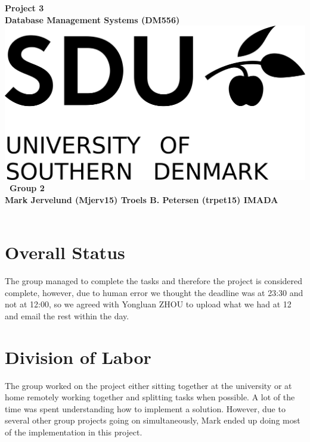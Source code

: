 \documentclass[a4paper,10pt,titlepage]{report}
\date{}
\begin{document}
\begin{titlepage}
\centering
    \vspace*{9\baselineskip}
    \huge
    \bfseries
    Project 3\\
    
    \normalfont 
	\huge    
    Database Management Systems (DM556)  \\[4\baselineskip]
    \normalfont
	\includegraphics[scale=1.5]{SDU_Logo}
    \vfill\
    Group 2\\
    Mark Jervelund (Mjerv15)    Troels B. Petersen (trpet15)
    \vspace{5mm}
    IMADA \\
    \textbf{\datedate} \\[2\baselineskip]
\end{titlepage}

\setcounter{page}{1}
\renewcommand{\thepage}{\arabic{page}}

\lstset{language=Java}          %
\section{Overall Status}
The group managed to complete the tasks and therefore the project is considered complete, however, due to human error we thought the deadline was at 23:30 and not at 12:00, so we agreed with Yongluan ZHOU to upload what we had at 12 and email the rest within the day.
\section{Division of Labor}
The group worked on the project either sitting together at the university or at home remotely working together and splitting tasks when possible. A lot of the time was spent understanding how to implement a solution. However, due to several other group projects going on simultaneously, Mark ended up doing most of the implementation in this project.
\end{document}

